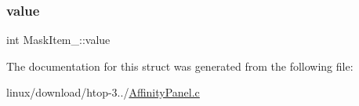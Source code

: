 \mbox{\label{structMaskItem___a2c23a5bfb38f67ca4853a5ffadd28da5}} 
\subsubsection{\texorpdfstring{value}{value}}
{\footnotesize\ttfamily int Mask\+Item\+\_\+\+::value}



The documentation for this struct was generated from the following file\+:\begin{DoxyCompactItemize}
\item 
linux/download/htop-\/3../\hyperlink{AffinityPanel_8c}{Affinity\+Panel.\+c}\end{DoxyCompactItemize}
